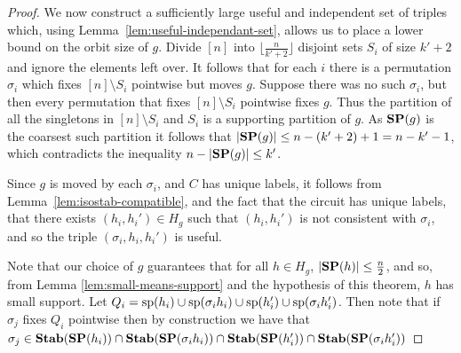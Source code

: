 \documentclass[../main/thesis.tex]{subfiles}
\begin{document}
\begin{proof}
  We now construct a sufficiently large useful and independent set of triples
  which, using Lemma~\ref{lem:useful-independant-set}, allows us to place a
  lower bound on the orbit size of $g$. Divide $[n]$ into $\lfloor \frac{n}{k' +
    2} \rfloor$ disjoint sets $S_i$ of size $k' + 2$ and ignore the elements
  left over. It follows that for each $i$ there is a permutation $\sigma_i$
  which fixes $[n] \setminus S_i$ pointwise but moves $g$. Suppose there was no
  such $\sigma_i$, but then every permutation that fixes $[n]\setminus S_i$
  pointwise fixes $g$. Thus the partition of all the singletons in $[n]\setminus
  S_i$ and $S_i$ is a supporting partition of $g$. As $\text{\textbf{SP}}(g)$ is the coarsest
  such partition it follows that $\vert \text{\textbf{SP}}(g) \vert \leq n - (k'+2) + 1 = n -
  k' - 1$, which contradicts the inequality $n - \vert \text{\textbf{SP}}(g) \vert \leq k'$.

  Since $g$ is moved by each $\sigma_i$, and $C$ has unique labels, it follows
  from Lemma~\ref{lem:isostab-compatible}, and the fact that the circuit has
  unique labels, that there exists $(h_i, h_i') \in H_g$ such that $(h_i, h_i')$
  is not consistent with $\sigma_i$, and so the triple $(\sigma_i, h_i, h_i')$
  is useful.

  Note that our choice of $g$ guarantees that for all $h \in H_g$, $\vert \text{\textbf{SP}}(h)
  \vert \leq \frac{n}{2}$, and so, from Lemma \ref{lem:small-means-support} and
  the hypothesis of this theorem, $h$ has small support. Let $Q_i = \text{sp}(h_i)
  \cup \text{sp}(\sigma_i h_i) \cup \text{sp}(h_i') \cup \text{sp}(\sigma_i h_i')$. Then
  note that if $\sigma_j$ fixes $Q_i$ pointwise then by construction we have
  that $\sigma_j \in \text{\textbf{Stab}}(\text{\textbf{SP}}(h_i)) \cap \text{\textbf{Stab}}(\text{\textbf{SP}}(\sigma_i h_i)) \cap
  \text{\textbf{Stab}}(\text{\textbf{SP}}(h_i')) \cap \text{\textbf{Stab}}(\text{\textbf{SP}}(\sigma_i h_i'))$


\end{proof}
\end{document}
